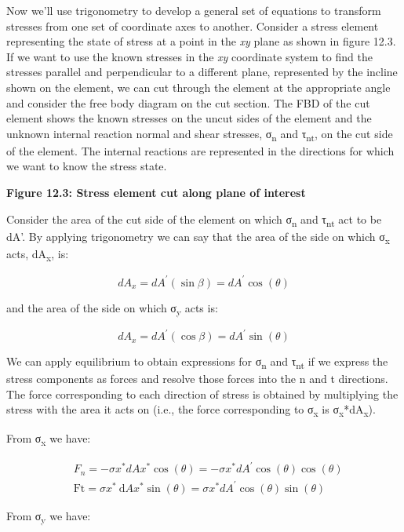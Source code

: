 \documentclass[
  letterpaper,
  DIV=11,
  numbers=noendperiod]{scrreprt}
\begin{document}
Now we'll use trigonometry to develop a general set of equations to
transform stresses from one set of coordinate axes to another. Consider
a stress element representing the state of stress at a point in the
\emph{xy} plane as shown in figure 12.3. If we want to use the known
stresses in the \emph{xy} coordinate system to find the stresses
parallel and perpendicular to a different plane, represented by the
incline shown on the element, we can cut through the element at the
appropriate angle and consider the free body diagram on the cut section.
The FBD of the cut element shows the known stresses on the uncut sides
of the element and the unknown internal reaction normal and shear
stresses, σ\textsubscript{n} and τ\textsubscript{nt}, on the cut side of
the element. The internal reactions are represented in the directions
for which we want to know the stress state.

\textbf{Figure 12.3: Stress element cut along plane of interest}

Consider the area of the cut side of the element on which
σ\textsubscript{n} and τ\textsubscript{nt} act to be dA'. By applying
trigonometry we can say that the area of the side on which
σ\textsubscript{x} acts, dA\textsubscript{x}, is:

\[
d A_x=d A^{\prime}(\sin \beta)=d A^{\prime} \cos (\theta)
\]

and the area of the side on which σ\textsubscript{y} acts is:

\[
d A_x=d A^{\prime}(\cos \beta)=d A^{\prime} \sin (\theta)
\]

We can apply equilibrium to obtain expressions for σ\textsubscript{n}
and τ\textsubscript{nt} if we express the stress components as forces
and resolve those forces into the n and t directions. The force
corresponding to each direction of stress is obtained by multiplying the
stress with the area it acts on (i.e., the force corresponding to
σ\textsubscript{x} is σ\textsubscript{x}*dA\textsubscript{x}).

From σ\textsubscript{x} we have:

\[
\begin{aligned}
& F_n=-\sigma x^* d A x^* \cos (\theta)=-\sigma x^* d A^{\prime} \cos (\theta) \cos (\theta) \\
& \mathrm{Ft}=\sigma x^* \mathrm{~d} A x^* \sin (\theta)=\sigma x^* d A^{\prime} \cos (\theta) \sin (\theta)
\end{aligned}
\]

From σ\textsubscript{y} we have:
\end{document}

